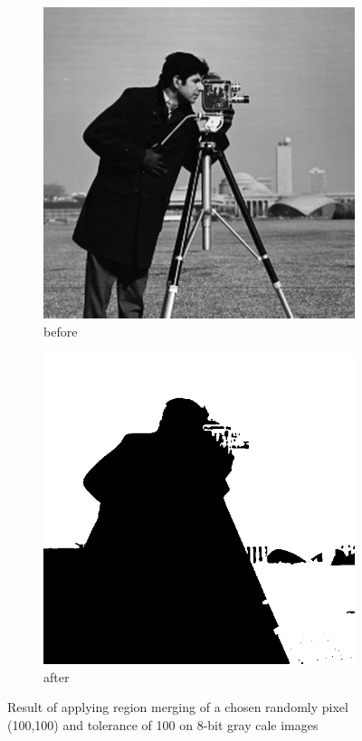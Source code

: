 \documentclass[12pt]{article}
\renewcommand{\subfiguresize}{.25\textwidth}
\begin{document}
\begin{figure}[h]
    \begin{subfigure}[t]{\subfiguresize}
        \includegraphics[width=\textwidth]{img/magda/camera.png}
        \caption{before}
    \end{subfigure}
    \hspace{2em}
    \begin{subfigure}[t]{\subfiguresize}
        \includegraphics[width=\textwidth]{img/magda/region_output2.png}
        \caption{after}
    \end{subfigure}
    \caption{Result of applying region merging of a chosen randomly pixel (100,100) and tolerance of 100 on 8-bit gray cale images}
\end{figure}
\end{document}
